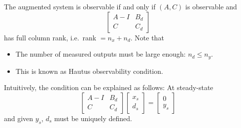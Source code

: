 The augmented system is observable if and only if $(A, C)$ is observable and
\begin{equation*}
    \begin{bmatrix}
        A - I & B_d \\
        C     & C_d
    \end{bmatrix}
\end{equation*}
has full column rank, i.e.\ rank $= n_x + n_d$.
\newpar{}
Note that
\begin{itemize}
    \item The number of measured outputs must be large enough: $n_d \leq n_y$.
    \item This is known as Hautus observability condition.
\end{itemize}
\newpar{}
Intuitively, the condition can be explained as follows: At steady-state
\begin{equation*}
    \begin{bmatrix}
        A - I & B_d \\
        C     & C_d
    \end{bmatrix}
    \begin{bmatrix}
        x_s \\
        d_s
    \end{bmatrix}
    =
    \begin{bmatrix}
        0 \\
        y_s
    \end{bmatrix}
\end{equation*}
and given $y_s$, $d_s$ must be uniquely defined.

